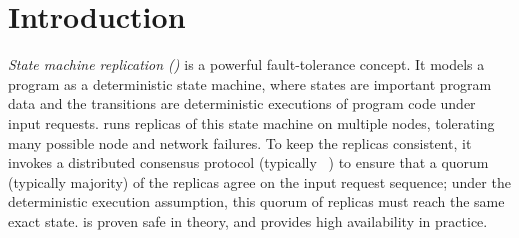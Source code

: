 \section{Introduction} \label{sec:intro}

\emph{State machine replication (\smr)} is a powerful fault-tolerance
concept.  It models a program as a deterministic state machine, where
states are important program data and the transitions are deterministic
executions of program code under input requests.  \smr runs replicas of
this state machine on multiple nodes, tolerating many possible node and
network failures.  To keep the replicas consistent, it invokes a
distributed consensus protocol (typically \paxos~\cite{paxos}) to ensure
that a quorum (typically majority) of the replicas agree on the input
request sequence; under the deterministic execution assumption, this
quorum of replicas must reach the same exact state.  \smr is proven safe
in theory, and provides high availability in practice.

